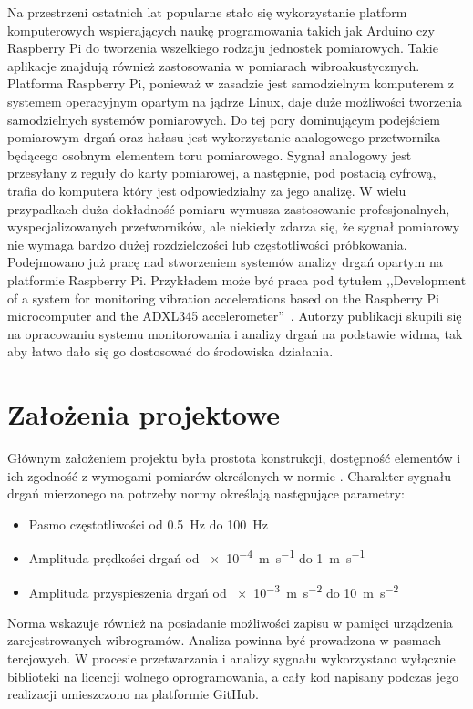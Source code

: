 \documentclass[a4paper,12pt]{mwart}
\let\Oldsection\section
\renewcommand{\section}{\FloatBarrier\Oldsection}
\begin{document}
Na przestrzeni ostatnich lat popularne stało się wykorzystanie platform
komputerowych wspierających naukę programowania takich jak Arduino czy Raspberry
Pi do tworzenia wszelkiego rodzaju jednostek pomiarowych. Takie aplikacje
znajdują również zastosowania w pomiarach wibroakustycznych. Platforma Raspberry
Pi, ponieważ w zasadzie jest samodzielnym komputerem z systemem operacyjnym
opartym na jądrze Linux, daje duże możliwości tworzenia samodzielnych systemów
pomiarowych. Do tej pory dominującym podejściem pomiarowym drgań oraz hałasu
jest wykorzystanie analogowego przetwornika będącego osobnym elementem toru
pomiarowego. Sygnał analogowy jest przesyłany z reguły do karty pomiarowej, a
następnie, pod postacią cyfrową, trafia do komputera który jest odpowiedzialny
za jego analizę. W wielu przypadkach duża dokładność pomiaru wymusza
zastosowanie profesjonalnych, wyspecjalizowanych przetworników, ale niekiedy
zdarza się, że sygnał pomiarowy nie wymaga bardzo dużej rozdzielczości lub
częstotliwości próbkowania. Podejmowano już pracę nad stworzeniem systemów
analizy drgań opartym na platformie Raspberry Pi. Przykładem może być praca pod
tytułem ,,Development of a system for monitoring vibration accelerations based
on the Raspberry Pi microcomputer and the ADXL345 accelerometer''~\cite{art1}.
Autorzy publikacji skupili się na opracowaniu systemu monitorowania i analizy
drgań na podstawie widma, tak aby łatwo dało się go dostosować do środowiska
działania. 

\section{Założenia projektowe}

Głównym założeniem projektu była prostota konstrukcji, dostępność elementów i
ich zgodność z wymogami pomiarów określonych w normie \cite{norma}. Charakter
sygnału drgań mierzonego na potrzeby normy określają następujące parametry:
\begin{itemize}
  \item Pasmo częstotliwości od \SI{0,5}{\hertz} do \SI{100}{\hertz}
  \item Amplituda prędkości drgań od \SI{e-4}{\metre\per\second} do \SI{1}{\metre\per\second}
  \item Amplituda przyspieszenia drgań od \SI{e-3}{\metre\per\square\second} do \SI{10}{\metre\per\square\second}
\end{itemize}
Norma wskazuje również na posiadanie możliwości zapisu w pamięci urządzenia
zarejestrowanych wibrogramów. Analiza powinna być prowadzona w pasmach
tercjowych. W procesie przetwarzania i analizy sygnału wykorzystano wyłącznie
biblioteki na licencji wolnego oprogramowania, a cały kod napisany podczas jego
realizacji umieszczono na platformie GitHub.
\end{document}
